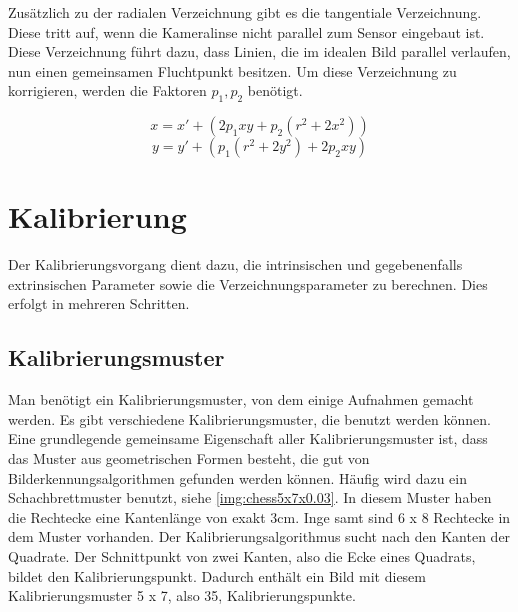 Zusätzlich zu der radialen Verzeichnung gibt es die tangentiale Verzeichnung. Diese tritt auf, wenn die Kameralinse nicht parallel zum Sensor eingebaut ist. Diese Verzeichnung führt dazu, dass Linien, die im idealen Bild parallel verlaufen, nun einen gemeinsamen Fluchtpunkt besitzen. Um diese Verzeichnung zu korrigieren, werden die Faktoren $p_1, p_2$ benötigt.

\begin{equation}
	x = x' + (2 p_1 xy + p_2 (r^2 + 2 x^2))
\end{equation}
\begin{equation}
	y = y' + (p_1(r^2 + 2 y^2) + 2p_2 xy)
\end{equation}

\section{Kalibrierung} %
\label{sec:kalibrierung}
Der Kalibrierungsvorgang dient dazu, die intrinsischen und gegebenenfalls extrinsischen Parameter sowie die Verzeichnungsparameter zu berechnen. Dies erfolgt in mehreren Schritten.

\subsection{Kalibrierungsmuster} %
\label{sub:kalibrierungsmuster}
Man benötigt ein Kalibrierungsmuster, von dem einige Aufnahmen gemacht werden. Es gibt verschiedene Kalibrierungsmuster, die benutzt werden können.  Eine grundlegende gemeinsame Eigenschaft aller Kalibrierungsmuster ist, dass das Muster aus geometrischen Formen besteht, die gut von Bilderkennungsalgorithmen gefunden werden können. Häufig wird dazu ein Schachbrettmuster benutzt, siehe \autoref{img:chess5x7x0.03}. In diesem Muster haben die Rechtecke eine Kantenlänge von exakt 3cm. Inge samt sind 6 x 8 Rechtecke in dem Muster vorhanden. Der Kalibrierungsalgorithmus sucht nach den Kanten der Quadrate. Der Schnittpunkt von zwei Kanten, also die Ecke eines Quadrats, bildet den Kalibrierungspunkt. Dadurch enthält ein Bild mit diesem Kalibrierungsmuster 5 x 7, also 35, Kalibrierungspunkte.

